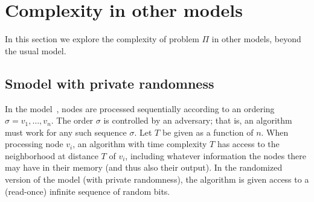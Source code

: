 \documentclass[11pt]{article}
\begin{document}
\section{Complexity in other models}
\label{sec:other-models}

In this section we explore the complexity of problem $\Pi$ in other models, beyond the usual \local model.

\subsection{S\local model with private randomness}\label{sec:slocal}

In the \slocal model~\cite{ghaffari17_complexity_stoc}, nodes are processed
sequentially according to an ordering $\sigma = v_1,\dots,v_n$. 
The order $\sigma$ is controlled by an adversary; that is, an \slocal algorithm
must work for any such sequence $\sigma$.
Let $T$ be given as a function of $n$.
When processing node $v_i$, an algorithm with time complexity $T$ has access to
the neighborhood at distance $T$ of $v_i$, including whatever information the
nodes there may have in their memory (and thus also their output).
In the randomized version of the model (with private randomness), the algorithm
is given access to a (read-once) infinite sequence of random bits.
\end{document}
